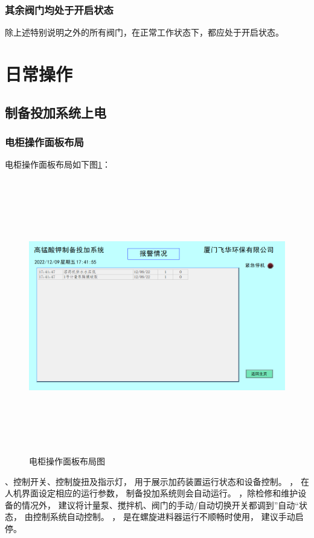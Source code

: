 \documentclass[UTF8,a4paper,12pt,titlepage]{ctexart}
\begin{document}
\subsubsection{其余阀门均处于开启状态}
      除上述特别说明之外的所有阀门，在正常工作状态下，都应处于开启状态。

\newpage %

\section{日常操作}
   \subsection{制备投加系统上电}
      \subsubsection{电柜操作面板布局}
         电柜操作面板布局如下图\ref{fig:g7}：
         \begin{figure}[h]
            \centering
            \includegraphics[height=12cm]{g5.png}
            \caption{电柜操作面板布局图}\label{fig:g7}
         \end{figure}
         \newline
         、控制开关、控制旋扭及指示灯，
         用于展示加药装置运行状态和设备控制。
         ，
         在人机界面设定相应的运行参数，
         制备投加系统则会自动运行。
         ，除检修和维护设备的情况外，
         建议将计量泵、搅拌机、阀门的手动/自动切换开关都调到”自动“状态，
         由控制系统自动控制。
         ，
         是在螺旋进料器运行不顺畅时使用，
         建议手动启停。
\end{document}
